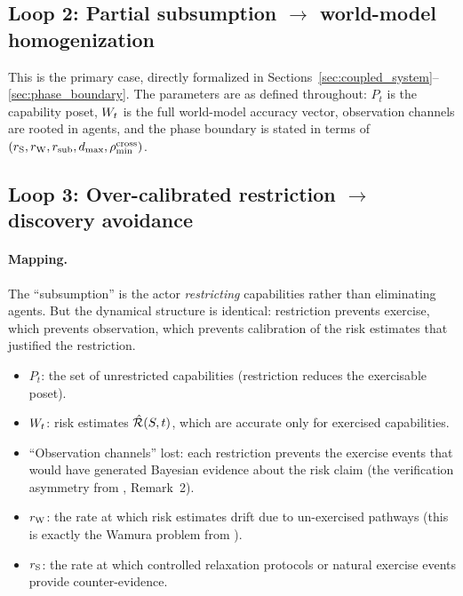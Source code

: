 \subsection{Loop 2: Partial subsumption $\to$ world-model homogenization}

This is the primary case, directly formalized in
Sections~\ref{sec:coupled_system}--\ref{sec:phase_boundary}.  The
parameters are as defined throughout: $P_t$ is the capability poset,
$W_t$ is the full world-model accuracy vector, observation channels
are rooted in agents, and the phase boundary is stated in terms of
$(r_{\mathrm{S}}, r_{\mathrm{W}}, r_{\mathrm{sub}}, d_{\mathrm{max}}, \rho_{\min}^{\mathrm{cross}})$.

\subsection{Loop 3: Over-calibrated restriction $\to$ discovery avoidance}

\paragraph{Mapping.}
The ``subsumption'' is the actor \emph{restricting} capabilities rather
than eliminating agents.  But the dynamical structure is identical:
restriction prevents exercise, which prevents observation, which
prevents calibration of the risk estimates that justified the
restriction.

\begin{itemize}
\item $P_t$: the set of unrestricted capabilities (restriction reduces
  the exercisable poset).
\item $W_t$: risk estimates $\hat{\mathcal{R}}(S, t)$, which are accurate
  only for exercised capabilities.
\item ``Observation channels'' lost: each restriction prevents the
  exercise events that would have generated Bayesian evidence about
  the risk claim (the verification asymmetry from
  \citet{lasser2026horizon}, Remark~2).
\item $r_{\mathrm{W}}$: the rate at which risk estimates drift due to
  un-exercised pathways (this is exactly the Wamura problem from
  \citet{lasser2026horizon}).
\item $r_{\mathrm{S}}$: the rate at which controlled relaxation protocols or
  natural exercise events provide counter-evidence.
\end{itemize}


